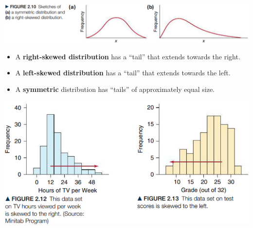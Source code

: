\documentclass[../mathNotesPreamble]{subfiles}
\begin{document}
  \begin{center}
    \vspace*{0.5\baselineskip}

    \includegraphics[width=0.95\linewidth]{images/math211_figure_2p10}
  \end{center}
  \begin{defn*}
    \begin{itemize}
      \item A \textbf{right-skewed distribution} has a ``tail'' that extends towards the right.
      \item A \textbf{left-skewed distribution} has a ``tail'' that extends towards the left.
      \item A \textbf{symmetric} distribution has ``tails'' of approximately equal size.
    \end{itemize}
  \end{defn*}
  \begin{center}
    \includegraphics[width=0.725\linewidth]{images/math211_figure_2p12_2p13}
  \end{center}
  \pagebreak
\end{document}
